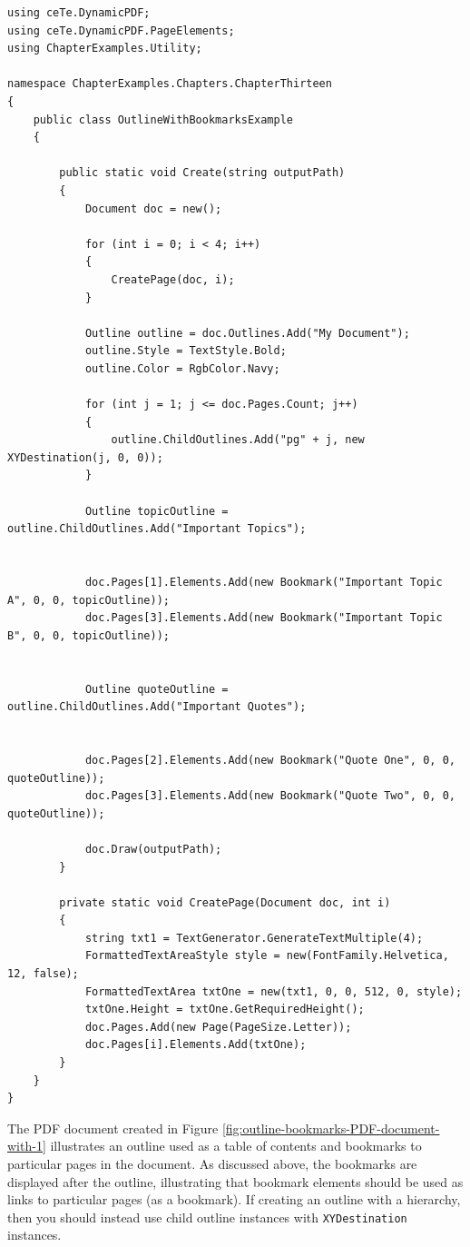\documentclass[american,letterpaper]{tufte-book}
\numberwithin{equation}{section}
\numberwithin{figure}{section}
\begin{document}
{\bgroup{}
\begin{lstlisting}[caption={Pdf with outline and bookmarks.},label={lis:outline-book-Pdf-document-with},basicstyle={\small\ttfamily},breaklines=true]
using ceTe.DynamicPDF;
using ceTe.DynamicPDF.PageElements;
using ChapterExamples.Utility;

namespace ChapterExamples.Chapters.ChapterThirteen
{
    public class OutlineWithBookmarksExample
    {

        public static void Create(string outputPath)
        {
            Document doc = new();

            for (int i = 0; i < 4; i++)
            {
                CreatePage(doc, i);
            }

            Outline outline = doc.Outlines.Add("My Document");
            outline.Style = TextStyle.Bold;
            outline.Color = RgbColor.Navy;

            for (int j = 1; j <= doc.Pages.Count; j++)
            {
                outline.ChildOutlines.Add("pg" + j, new XYDestination(j, 0, 0));
            }

            Outline topicOutline = outline.ChildOutlines.Add("Important Topics");


            doc.Pages[1].Elements.Add(new Bookmark("Important Topic A", 0, 0, topicOutline));
            doc.Pages[3].Elements.Add(new Bookmark("Important Topic B", 0, 0, topicOutline));


            Outline quoteOutline = outline.ChildOutlines.Add("Important Quotes");


            doc.Pages[2].Elements.Add(new Bookmark("Quote One", 0, 0, quoteOutline));
            doc.Pages[3].Elements.Add(new Bookmark("Quote Two", 0, 0, quoteOutline));

            doc.Draw(outputPath);
        }

        private static void CreatePage(Document doc, int i)
        {
            string txt1 = TextGenerator.GenerateTextMultiple(4);
            FormattedTextAreaStyle style = new(FontFamily.Helvetica, 12, false);
            FormattedTextArea txtOne = new(txt1, 0, 0, 512, 0, style);
            txtOne.Height = txtOne.GetRequiredHeight();
            doc.Pages.Add(new Page(PageSize.Letter));
            doc.Pages[i].Elements.Add(txtOne);
        }
    }
}
\end{lstlisting}
\leavevmode\egroup

The PDF document created in Figure \ref{fig:outline-bookmarks-PDF-document-with-1}
illustrates an outline used as a table of contents and bookmarks to
particular pages in the document. As discussed above, the bookmarks
are displayed after the outline, illustrating that bookmark elements
should be used as links to particular pages (as a bookmark). If creating
an outline with a hierarchy, then you should instead use child outline
instances with \texttt{XYDestination} instances.

}
\end{document}
